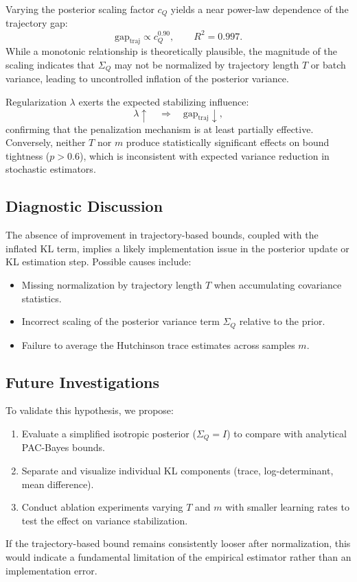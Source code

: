Varying the posterior scaling factor $c_Q$ yields a near power-law dependence of the trajectory gap:
\begin{equation}
    \text{gap}_{\text{traj}} \propto c_Q^{0.90}, \qquad R^2 = 0.997.
\end{equation}
While a monotonic relationship is theoretically plausible, the magnitude of the scaling indicates that $\Sigma_Q$ may not be normalized by trajectory length $T$ or batch variance, leading to uncontrolled inflation of the posterior variance.

Regularization $\lambda$ exerts the expected stabilizing influence:
\[
\lambda \uparrow \quad \Rightarrow \quad \text{gap}_{\text{traj}} \downarrow,
\]
confirming that the penalization mechanism is at least partially effective. Conversely, neither $T$ nor $m$ produce statistically significant effects on bound tightness ($p > 0.6$), which is inconsistent with expected variance reduction in stochastic estimators.

\subsection{Diagnostic Discussion}

The absence of improvement in trajectory-based bounds, coupled with the inflated KL term, implies a likely implementation issue in the posterior update or KL estimation step. Possible causes include:
\begin{itemize}
    \item Missing normalization by trajectory length $T$ when accumulating covariance statistics.
    \item Incorrect scaling of the posterior variance term $\Sigma_Q$ relative to the prior.
    \item Failure to average the Hutchinson trace estimates across samples $m$.
\end{itemize}

\subsection{Future Investigations}

To validate this hypothesis, we propose:
\begin{enumerate}
    \item Evaluate a simplified isotropic posterior ($\Sigma_Q = I$) to compare with analytical PAC-Bayes bounds.
    \item Separate and visualize individual KL components (trace, log-determinant, mean difference).
    \item Conduct ablation experiments varying $T$ and $m$ with smaller learning rates to test the effect on variance stabilization.
\end{enumerate}

If the trajectory-based bound remains consistently looser after normalization, this would indicate a fundamental limitation of the empirical estimator rather than an implementation error.